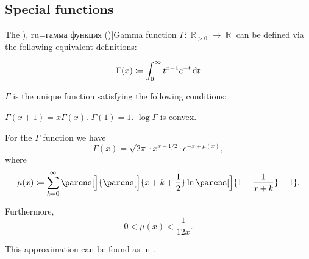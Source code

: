 \subsection{Special functions}\label{subsec:special_functions}

\begin{definition}\label{def:gamma_function}
  The \term[bg=гама (функция) (\cite[280]{Тагамлицки1978Инт}), ru=гамма функция (\cite[406]{Зорич2019Том2})]{Gamma function} \( \Gamma: \BbbR_{>0} \to \BbbR \) can be defined via the following equivalent definitions:
  \begin{thmenum}
    \begin{equation}\label{eq:def:gamma_function/direct}
      \Gamma(x) \coloneqq \int_0^\infty t^{x-1} e^{-t} \dl t
    \end{equation}

     \( \Gamma \) is the unique function satisfying the following conditions:
    \begin{thmenum}
       \( \Gamma(x + 1) = x \Gamma(x) \).
       \( \Gamma(1) = 1 \).
       \( \log \Gamma \) is \hyperref[def:convex_functions]{convex}.
    \end{thmenum}
  \end{thmenum}
\end{definition}

\begin{theorem}\label{thm:stirlings_gamma_approximation}
  For the \( \Gamma \) function we have
  \begin{equation}\label{eq:thm:stirlings_gamma_approximation}
    \Gamma(x) = \sqrt{2 \pi} \cdot x^{x - 1 / 2} \cdot e^{-x + \mu(x)},
  \end{equation}
  where
  \begin{equation}\label{eq:thm:stirlings_gamma_approximation/mu}
    \mu(x) \coloneqq \sum_{k=0}^\infty \parens[\Big]{ \parens[\Big]{ x + k + \frac 1 2 } \ln\parens[\Big]{ 1 + \frac 1 {x + k} } - 1 }.
  \end{equation}

  Furthermore,
  \begin{equation}\label{eq:thm:stirlings_gamma_approximation/mu_inequality}
    0 < \mu(x) < \frac 1 {12x}.
  \end{equation}
\end{theorem}
\begin{comments}
  \item This approximation can be found as  in \cite{code}.
\end{comments}
